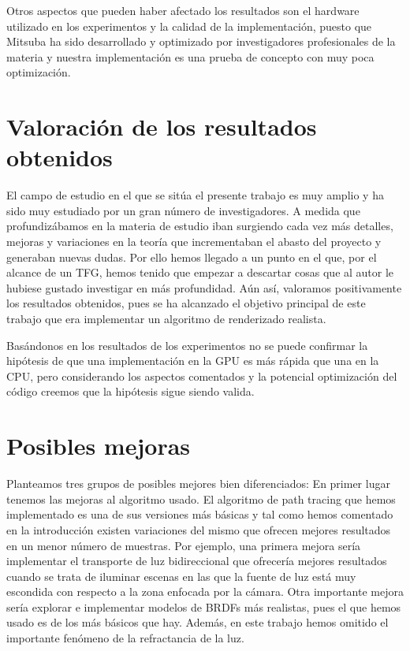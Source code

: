 \medskip
Otros aspectos que pueden haber afectado los resultados son el hardware utilizado en los experimentos y la calidad de la implementación, puesto que Mitsuba ha sido desarrollado y optimizado por investigadores profesionales de la materia y nuestra implementación es una prueba de concepto con muy poca optimización.

\clearpage


\section{Valoración de los resultados obtenidos}


El campo de estudio en el que se sitúa el presente trabajo es muy amplio y ha sido muy estudiado por un gran número de investigadores. A medida que profundizábamos en la materia de estudio iban surgiendo cada vez más detalles, mejoras y variaciones en la teoría que incrementaban el abasto del proyecto y generaban nuevas dudas. Por ello hemos llegado a un punto en el que, por el alcance de un TFG, hemos tenido que empezar a descartar cosas que al autor le hubiese gustado investigar en más profundidad. Aún así, valoramos positivamente los resultados obtenidos, pues se ha alcanzado el objetivo principal de este trabajo que era implementar un algoritmo de renderizado realista. 

\medskip

Basándonos en los resultados de los experimentos no se puede confirmar la hipótesis de que una implementación en la GPU es más rápida que una en la CPU, pero considerando los aspectos comentados y la potencial optimización del código creemos que la hipótesis sigue siendo valida.

\clearpage

\section{Posibles mejoras}

Planteamos tres grupos de posibles mejores bien diferenciados: En primer lugar tenemos las mejoras al algoritmo usado. El algoritmo de path tracing que hemos implementado es una de sus versiones más básicas y tal como hemos comentado en la introducción existen variaciones del mismo que ofrecen mejores resultados en un menor número de muestras. Por ejemplo, una primera mejora sería implementar el transporte de luz bidireccional que ofrecería mejores resultados cuando se trata de iluminar escenas en las que la fuente de luz está muy escondida con respecto a la zona enfocada por la cámara. Otra importante mejora sería explorar e implementar modelos de BRDFs más realistas, pues el que hemos usado es de los más básicos que hay. Además, en este trabajo hemos omitido el importante fenómeno de la refractancia de la luz.

